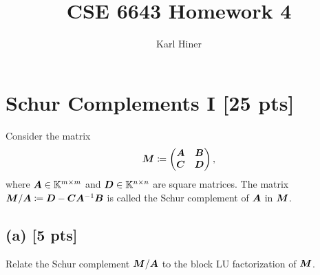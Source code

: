 \documentclass[twoside,10pt]{article}
\begin{document}
\title{CSE 6643 Homework 4}
\author{Karl Hiner}
\date{}
\maketitle

\section{Schur Complements I [25 pts]}
Consider the matrix 
\begin{equation}
  \bm{M}
  \coloneqq
  \begin{pmatrix}
    \bm{A} & \bm{B}\\
    \bm{C} & \bm{D}
  \end{pmatrix}, 
\end{equation}
where $\bm{A} \in \mathbb{K}^{m \times m}$ and $\bm{D} \in \mathbb{K}^{n \times n}$ are square matrices.
The matrix $\bm{M}/\bm{A} \coloneqq \bm{D} - \bm{C} \bm{A}^{-1} \bm{B}$ is called the Schur complement of $\bm{A}$ in $\bm{M}$.    

\subsection*{(a) [5 pts]} 
  Relate the Schur complement $\bm{M} / \bm{A}$ to the block LU factorization of $\bm{M}$.
\end{document}
